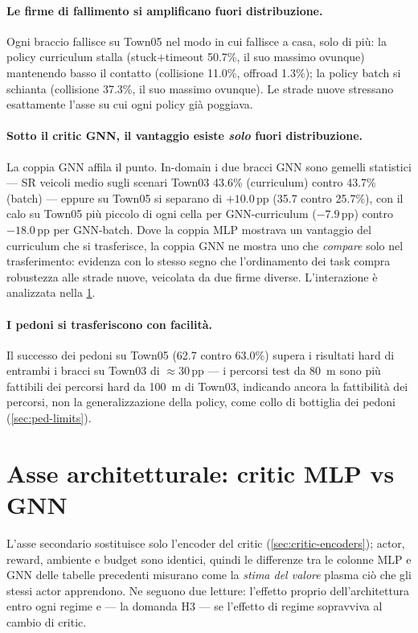\paragraph{Le firme di fallimento si amplificano fuori distribuzione.}
Ogni braccio fallisce su Town05 nel modo in cui fallisce a casa, solo
di più: la policy curriculum stalla (stuck$+$timeout 50.7\%, il suo
massimo ovunque) mantenendo basso il contatto (collisione 11.0\%,
offroad 1.3\%); la policy batch si schianta (collisione 37.3\%, il suo
massimo ovunque). Le strade nuove stressano esattamente l'asse su cui
ogni policy già poggiava.

\paragraph{Sotto il critic GNN, il vantaggio esiste \emph{solo} fuori
distribuzione.}
La coppia GNN affila il punto. In-domain i due bracci GNN sono gemelli
statistici --- SR veicoli medio sugli scenari Town03 43.6\%
(curriculum) contro 43.7\% (batch) --- eppure su Town05 si separano di
$+10.0$\,pp (35.7 contro 25.7\%), con il calo su Town05 più piccolo di
ogni cella per GNN-curriculum ($-7.9$\,pp) contro $-18.0$\,pp per
GNN-batch. Dove la coppia MLP mostrava un vantaggio del curriculum che
si trasferisce, la coppia GNN ne mostra uno che \emph{compare} solo nel
trasferimento: evidenza con lo stesso segno che l'ordinamento dei task
compra robustezza alle strade nuove, veicolata da due firme diverse.
L'interazione è analizzata nella \cref{sec:arch-axis}.

\paragraph{I pedoni si trasferiscono con facilità.}
Il successo dei pedoni su Town05 (62.7 contro 63.0\%) supera i
risultati hard di entrambi i bracci su Town03 di $\approx 30$\,pp ---
i percorsi test da \SI{80}{m} sono più fattibili dei percorsi hard da
\SI{100}{m} di Town03, indicando ancora la fattibilità dei percorsi,
non la generalizzazione della policy, come collo di bottiglia dei
pedoni (\cref{sec:ped-limits}).

\section{Asse architetturale: critic MLP vs GNN}
\label{sec:arch-axis}

L'asse secondario sostituisce solo l'encoder del critic
(\cref{sec:critic-encoders}); actor, reward, ambiente e budget sono
identici, quindi le differenze tra le colonne MLP e GNN delle tabelle
precedenti misurano come la \emph{stima del valore} plasma ciò che gli
stessi actor apprendono. Ne seguono due letture: l'effetto proprio
dell'architettura entro ogni regime e --- la domanda H3 --- se
l'effetto di regime sopravviva al cambio di critic.

